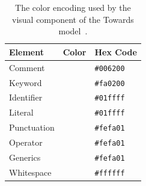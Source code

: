 \documentclass[%
class=scrreprt,
chapterprefix=false,%
open=right,%
twoside=true,%
paper=a4,%
logofile={Logo\_zentral\_farbig\_EN.png},%
thesistype=master,%
UKenglish,%
]{se2thesis}
\theoremstyle{definition}
\begin{document}
	\begin{table}[tb]
		\centering
		\caption{The color encoding used by the visual component of the Towards model~\cite{mi2022towards}.}
		\label{tab:model-colors}
		\begin{tabular}{lll}
			\toprule
			Element & Color & Hex Code \\
			\midrule
			Comment & \cellcolor{CommentColor} & \texttt{\#006200} \\
			Keyword & \cellcolor{KeywordColor} & \texttt{\#fa0200} \\
			Identifier & \cellcolor{IdentifierColor} & \texttt{\#01ffff} \\
			Literal & \cellcolor{LiteralColor} & \texttt{\#01ffff} \\
			Punctuation & \cellcolor{PunctuationColor} & \texttt{\#fefa01} \\
			Operator & \cellcolor{OperatorColor} & \texttt{\#fefa01} \\
			Generics & \cellcolor{GenericsColor} & \texttt{\#fefa01} \\
			Whitespace & \cellcolor{WhitespaceColor} & \texttt{\#ffffff} \\
			\bottomrule
		\end{tabular}
	\end{table}
	
%	
	
\end{document}
